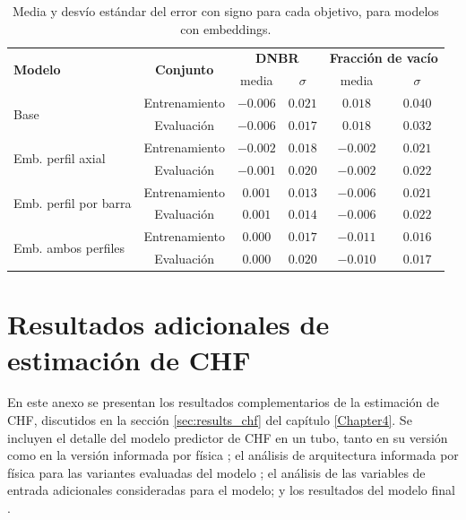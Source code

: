 \begin{table}[h]
	\centering
	\caption{Media y desvío estándar del error con signo para cada objetivo, para modelos con embeddings.}
	\begin{tabular}{l c c c c c} 
        \toprule
        \multirow{2}{*}{\textbf{Modelo}} & \multirow{2}{*}{\textbf{Conjunto}} & \multicolumn{2}{c}{\textbf{DNBR}} & \multicolumn{2}{c}{\textbf{Fracción de vacío}} \\
        &         & media     & $\sigma$  & media & $\sigma$  \\ \hline
        \multirow{2}{*}{Base}
        & Entrenamiento &  $-0.006$    & $0.021$     & $0.018$ & $0.040$ \\
        & Evaluación    &  $-0.006$    & $0.017$     & $0.018$ & $0.032$ \\ \hline
        \multirow{2}{*}{Emb. perfil axial}
        & Entrenamiento & $-0.002$ & $0.018$ & $-0.002$ & $0.021$ \\
        & Evaluación    & $-0.001$ & $0.020$ & $-0.002$ & $0.022$   \\   \hline
        \multirow{2}{*}{Emb. perfil por barra}
        & Entrenamiento & $0.001$ & $0.013$ & $-0.006$ & $0.021$ \\
        & Evaluación    & $0.001$ & $0.014$ & $-0.006$ & $0.022$ \\   \hline
        \multirow{2}{*}{Emb. ambos perfiles}
        & Entrenamiento & $0.000$ & $0.017$ & $-0.011$ & $0.016$ \\
        & Evaluación    & $0.000$ & $0.020$ & $-0.010$ & $0.017$ \\

		\bottomrule
	\end{tabular}
	\label{tab:plc_emb_errors_dnbr_vacio}
\end{table}

\chapter{Resultados adicionales de estimación de CHF}
\label{appendix_chf}

En este anexo se presentan los resultados complementarios de la estimación de CHF, discutidos en la sección \ref{sec:results_chf} del capítulo \ref{Chapter4}. Se incluyen el detalle del modelo predictor de CHF en un tubo, tanto en su versión \lfdnn{} como en la versión informada por física \lfpinn{}; el análisis de arquitectura informada por física para las variantes evaluadas del modelo \mfpinn{}; el análisis de las variables de entrada adicionales consideradas para el modelo; y los resultados del modelo final \mfdnn{}.

